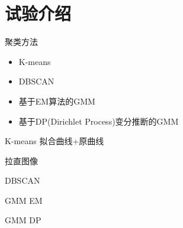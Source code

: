 \section{试验介绍}
\begin{frame}{聚类方法}
    \begin{itemize}
        \item K-means
        \item DBSCAN
        \item 基于EM算法的GMM
        \item 基于DP(Dirichlet Process)变分推断的GMM
    \end{itemize}
\end{frame}

\begin{frame}{K-means}
    拟合曲线+原曲线

    拉直图像
\end{frame}

\begin{frame}{DBSCAN}
    
\end{frame}

\begin{frame}{GMM EM}
    
\end{frame}

\begin{frame}{GMM DP}
    
\end{frame}